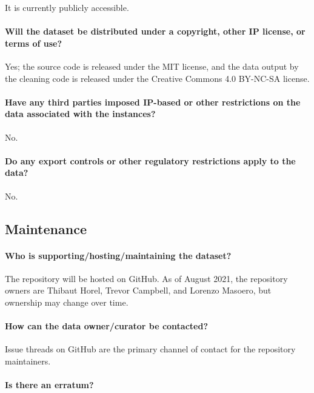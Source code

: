 It is currently publicly accessible.

\paragraph{Will the dataset be distributed under a copyright, other IP license, or terms of use?}

Yes; the source code is released under the MIT license, and the data output by the cleaning code is released under the Creative Commons 4.0 BY-NC-SA license.

\paragraph{Have any third parties imposed IP-based or other restrictions on the data associated with the instances?}

No.

\paragraph{Do any export controls or other regulatory restrictions apply to the data?}

No.

\subsection{Maintenance}

\paragraph{Who is supporting/hosting/maintaining the dataset?}

The repository will be hosted on GitHub. As of August 2021, the repository
owners are Thibaut Horel, Trevor Campbell, and Lorenzo Masoero, but ownership
may change over time.

\paragraph{How can the data owner/curator be contacted?}

Issue threads on GitHub are the primary channel of contact for the repository maintainers.

\paragraph{Is there an erratum?}

